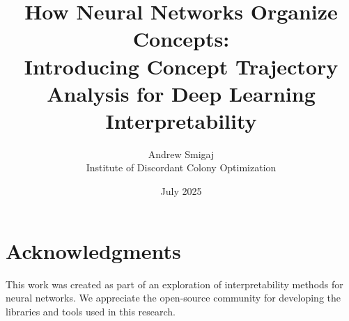 \documentclass[11pt,a4paper]{article}
\title{How Neural Networks Organize Concepts:\\
Introducing Concept Trajectory Analysis for Deep Learning Interpretability}
\author{Andrew Smigaj \\
Institute of Discordant Colony Optimization}
\date{July 2025}
\begin{document}
\maketitle
























\section*{Acknowledgments}
This work was created as part of an exploration of interpretability methods for neural networks. We appreciate the open-source community for developing the libraries and tools used in this research.



\end{document}
